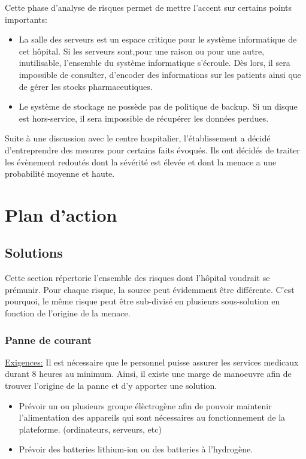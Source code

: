 \documentclass[12pt]{article}
\begin{document}
\justify
Cette phase d'analyse de risques permet de mettre l'accent sur certains points importants:
\begin{itemize}
\item La salle des serveurs est un espace critique pour le système informatique de cet hôpital. Si les serveurs sont,pour une raison ou pour une autre, inutilisable, l'ensemble du système informatique s'écroule. Dès lors, il sera impossible de consulter, d'encoder des informations sur les patients ainsi que de gérer les stocks pharmaceutiques.
\item Le système de stockage ne possède pas de politique de backup. Si un disque est hors-service, il sera impossible de récupérer les données perdues.
\end{itemize}
\justify
Suite à une discussion avec le centre hospitalier, l'établissement a décidé d'entreprendre des mesures pour certains faits évoqués. Ils ont décidés de traiter les évènement redoutés dont la sévérité est élevée et dont la menace a une probabilité moyenne et haute.

\section{Plan d'action}

\subsection{Solutions}

Cette section répertorie l'ensemble des risques dont l'hôpital voudrait se prémunir. Pour chaque risque, la source peut évidemment être différente. C'est pourquoi, le même risque peut être sub-divisé en plusieurs sous-solution en fonction de l'origine de la menace.

\subsubsection{Panne de courant}

\justify
\underline{Exigences:} Il est nécessaire que le personnel puisse assurer les services medicaux durant 8 heures au minimum. Ainsi, il existe une marge de manoeuvre afin de trouver l'origine de la panne et d'y apporter une solution.

\begin{itemize}
	\item Prévoir un ou plusieurs groupe élèctrogène afin de pouvoir maintenir l'alimentation des appareils qui sont nécessaires au fonctionnement de la plateforme. (ordinateurs, serveurs, etc)
	\item Prévoir des batteries lithium-ion ou des batteries à l'hydrogène.
\end{itemize}
\end{document}
